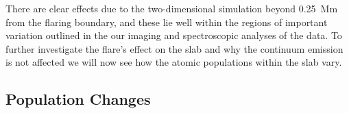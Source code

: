 There are clear effects due to the two-dimensional simulation beyond \SI{0.25}{\mega\metre} from the flaring boundary, and these lie well within the regions of important variation outlined in the our imaging and spectroscopic analyses of the data.
To further investigate the flare's effect on the slab and why the continuum emission is not affected we will now see how the atomic populations within the slab vary.

\subsection{Population Changes}

